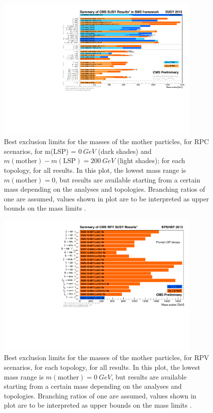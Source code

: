 \begin{figure}
	\centering
	\includegraphics[width=0.9\textwidth]{Images/Introduction/barplot_blue_orange_SUSY2013.pdf}
	\caption{Best exclusion limits for the masses of the mother particles, for RPC scenarios, for m(LSP) = $0~\si{GeV}$ (dark shades) and $m(\text{mother}) - m(\text{LSP}) = 200~\si{GeV}$ (light shades); for each topology, for all results. In this plot, the lowest mass range is $m(\text{mother})=0$, but results are available starting from a certain mass depending on the analyses and topologies. Branching ratios of one are assumed, values shown in plot are to be interpreted as upper bounds on the mass limits \cite{cms_results}.}
	\label{fig:MODEL_DEPENDENT_1}
\end{figure}
\begin{figure}
	\centering
	\includegraphics[width=0.9\textwidth]{Images/Introduction/RPVbarplot_blue_orange_EPSHEP2013.pdf}
	\caption{Best exclusion limits for the masses of the mother particles, for RPV scenarios, for each topology, for all results. In this plot, the lowest mass range is $m(\text{mother})=0~\si{GeV}$, but results are available starting from a certain mass depending on the analyses and topologies. Branching ratios of one are assumed, values shown in plot are to be interpreted as upper bounds on the mass limits \cite{cms_results}.}
	\label{fig:MODEL_DEPENDENT_2}
\end{figure}

